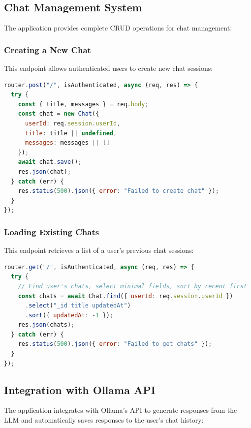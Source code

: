 \documentclass[12pt,a4paper]{article}
\begin{document}
\subsection{Chat Management System}
The application provides complete CRUD operations for chat management:

\subsubsection{Creating a New Chat}
This endpoint allows authenticated users to create new chat sessions:
\begin{lstlisting}[language=JavaScript]
router.post("/", isAuthenticated, async (req, res) => {
  try {
    const { title, messages } = req.body;
    const chat = new Chat({
      userId: req.session.userId,
      title: title || undefined,
      messages: messages || []
    });
    await chat.save();
    res.json(chat);
  } catch (err) {
    res.status(500).json({ error: "Failed to create chat" });
  }
});
\end{lstlisting}

\subsubsection{Loading Existing Chats}
This endpoint retrieves a list of a user's previous chat sessions:
\begin{lstlisting}[language=JavaScript]
router.get("/", isAuthenticated, async (req, res) => {
  try {
    // Find user's chats, select minimal fields, sort by recent first
    const chats = await Chat.find({ userId: req.session.userId })
      .select("_id title updatedAt")
      .sort({ updatedAt: -1 });
    res.json(chats);
  } catch (err) {
    res.status(500).json({ error: "Failed to get chats" });
  }
});
\end{lstlisting}

\subsection{Integration with Ollama API}
The application integrates with Ollama's API to generate responses from the LLM and automatically saves responses to the user's chat history:
\end{document}
